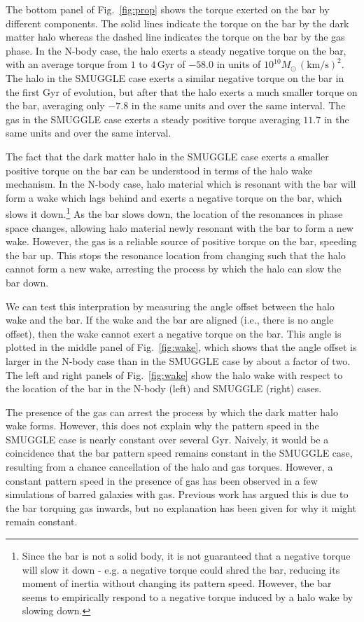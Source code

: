 \documentclass{natureprintstyle}
\begin{document}
The bottom panel of Fig.~\ref{fig:prop} shows the torque exerted on the bar by
different components. The solid lines indicate the torque on the bar by the
dark matter halo whereas the dashed line indicates the torque on the bar by
the gas phase. In the N-body case, the halo exerts a steady negative torque on
the bar, with an average torque from $1$ to $4\,\textrm{Gyr}$ of $-58.0$ in
units of $10^{10}M_{\odot}\,(\textrm{km}/\textrm{s})^2$. The halo in the
SMUGGLE case exerts a similar negative torque on the bar in the first Gyr of
evolution, but after that the halo exerts a much smaller torque on the bar,
averaging only $-7.8$ in the same units and over the same interval. The gas in
the SMUGGLE case exerts a steady positive torque averaging $11.7$ in the same
units and over the same interval.

The fact that the dark matter halo in the SMUGGLE case exerts a smaller
positive torque on the bar can be understood in terms of the halo wake
mechanism. In the N-body case, halo material which is resonant with the bar
will form a wake which lags behind and exerts a negative torque on the bar,
which slows it down.\cite{1984MNRAS.209..729T, 1985MNRAS.213..451W,
1992ApJ...400...80H}\footnote{Since the bar is not a solid body, it is not
guaranteed that a negative torque will slow it down - e.g. a negative torque
could shred the bar, reducing its moment of inertia without changing its
pattern speed. However, the bar seems to empirically respond to a negative
torque induced by a halo wake by slowing down.} As the bar slows down, the
location of the resonances in phase space changes, allowing halo material
newly resonant with the bar to form a new wake. However, the gas is a reliable
source of positive torque on the bar, speeding the bar up. This stops the
resonance location from changing such that the halo cannot form a new wake,
arresting the process by which the halo can slow the bar down.

We can test this interpration by measuring the angle offset between the halo
wake and the bar. If the wake and the bar are aligned (i.e., there is no angle
offset), then the wake cannot exert a negative torque on the bar. This angle
is plotted in the middle panel of Fig.~\ref{fig:wake}, which shows that the
angle offset is larger in the N-body case than in the SMUGGLE case by about a
factor of two. The left and right panels of Fig.~\ref{fig:wake} show the halo
wake with respect to the location of the bar in the N-body (left) and SMUGGLE
(right) cases.

The presence of the gas can arrest the process by which the dark matter halo
wake forms. However, this does not explain why the pattern speed in the
SMUGGLE case is nearly constant over several Gyr. Naively, it would be a
coincidence that the bar pattern speed remains constant in the SMUGGLE case,
resulting from a chance cancellation of the halo and gas torques. However, a
constant pattern speed in the presence of gas has been observed in a few
simulations of barred galaxies with gas.\cite{1993AA...268...65F,
2010ApJ...719.1470V} Previous work has argued this is due to the bar torquing
gas inwards, but no explanation has been given for why it might remain
constant.
\end{document}
